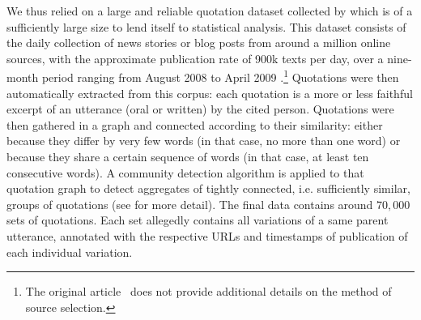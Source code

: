We thus relied on a large and reliable quotation dataset collected by \citet{Leskovec09} which 
is of a sufficiently large size to lend itself to statistical analysis.
This dataset consists of the daily collection of news stories or blog posts from around a million online sources, with the approximate publication rate of 900k texts per day, over a nine-month period ranging from August 2008 to April 2009 \cite{Leskovec09-url}.\footnote{The original article~\citep{Leskovec09} does not provide additional details on the method of source selection.}
Quotations were then automatically extracted from this corpus: each quotation is a more or less faithful excerpt of an utterance (oral or written) by the cited person. Quotations were then gathered in a graph and connected according to their similarity: either because they differ by very few words (in that case, no more than one word) or because they share a certain sequence of words (in that case, at least ten consecutive words). A community detection algorithm is applied to that quotation graph to detect aggregates of tightly connected, i.e. sufficiently similar, groups of quotations (see \citet{Leskovec09} for more detail).  The final data contains around $70,000$ sets of quotations. Each set allegedly contains all variations of a same parent utterance, annotated with the respective URLs and timestamps of publication of each individual variation. %

